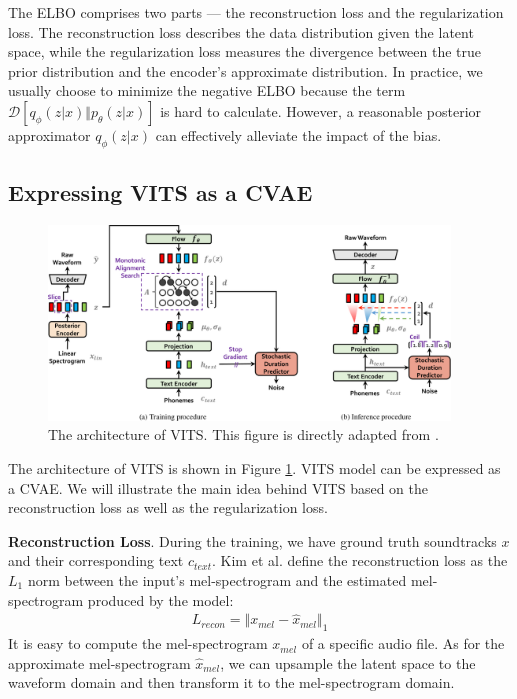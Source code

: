 \documentclass{article}
\begin{document}
The ELBO comprises two parts --- the reconstruction loss and the regularization loss. The reconstruction loss describes the data distribution given the latent space, while the regularization loss measures the divergence between the true prior distribution and the encoder's approximate distribution. In practice, we usually choose to minimize the negative ELBO because the term $\mathcal{D}\left[q_{\phi} \left(z|x\right)\Vert p_{\theta}\left(z|x \right) \right]$ is hard to calculate. However, a reasonable posterior approximator $q_\phi(z|x)$ can effectively alleviate the impact of the bias.

\subsection{Expressing VITS as a CVAE}
\begin{figure}[!ht]
    \begin{center}
        \includegraphics[width=0.95\textwidth]{vits.png}
    \end{center}
    \caption{The architecture of VITS. This figure is directly adapted from \cite{2021kim}.}
    \label{fig:method-vits}
\end{figure}

The architecture of VITS is shown in Figure \ref{fig:method-vits}. VITS model can be expressed as a CVAE. We will illustrate the main idea behind VITS based on the reconstruction loss as well as the regularization loss.

\textbf{Reconstruction Loss}. During the training, we have ground truth soundtracks $x$ and their corresponding text $c_{text}$. Kim et al. \cite{2021kim} define the reconstruction loss as the $L_1$ norm between the input's mel-spectrogram and the estimated mel-spectrogram produced by the model:
\begin{align}
    L_{recon} = \Vert x_{mel} - \hat{x}_{mel} \Vert_1
\end{align}
It is easy to compute the mel-spectrogram $x_{mel}$ of a specific audio file. As for the approximate mel-spectrogram $\hat{x}_{mel}$, we can upsample the latent space to the waveform domain and then transform it to the mel-spectrogram domain.
\end{document}
